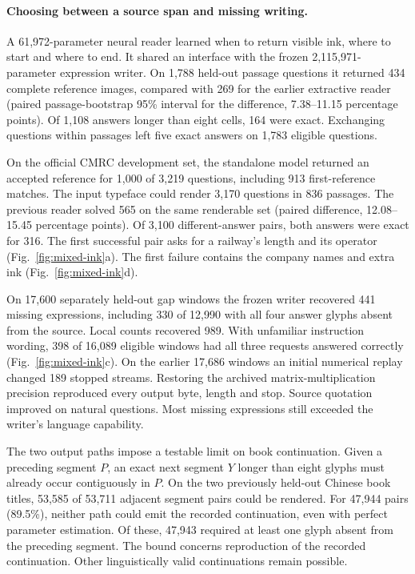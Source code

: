 \paragraph{Choosing between a source span and missing writing.}
A 61,972-parameter neural reader learned when to return visible ink, where to start and where to end. It shared an interface with the frozen 2,115,971-parameter expression writer. On 1,788 held-out passage questions it returned 434 complete reference images, compared with 269 for the earlier extractive reader (paired passage-bootstrap 95\% interval for the difference, 7.38--11.15 percentage points). Of 1,108 answers longer than eight cells, 164 were exact. Exchanging questions within passages left five exact answers on 1,783 eligible questions.

On the official CMRC development set, the standalone model returned an accepted reference for 1,000 of 3,219 questions, including 913 first-reference matches. The input typeface could render 3,170 questions in 836 passages. The previous reader solved 565 on the same renderable set (paired difference, 12.08--15.45 percentage points). Of 3,100 different-answer pairs, both answers were exact for 316. The first successful pair asks for a railway's length and its operator (Fig.~\ref{fig:mixed-ink}a). The first failure contains the company names and extra ink (Fig.~\ref{fig:mixed-ink}d).

On 17,600 separately held-out gap windows the frozen writer recovered 441 missing expressions, including 330 of 12,990 with all four answer glyphs absent from the source. Local counts recovered 989. With unfamiliar instruction wording, 398 of 16,089 eligible windows had all three requests answered correctly (Fig.~\ref{fig:mixed-ink}c). On the earlier 17,686 windows an initial numerical replay changed 189 stopped streams. Restoring the archived matrix-multiplication precision reproduced every output byte, length and stop. Source quotation improved on natural questions. Most missing expressions still exceeded the writer's language capability.

The two output paths impose a testable limit on book continuation. Given a preceding segment $P$, an exact next segment $Y$ longer than eight glyphs must already occur contiguously in $P$. On the two previously held-out Chinese book titles, 53,585 of 53,711 adjacent segment pairs could be rendered. For 47,944 pairs (89.5\%), neither path could emit the recorded continuation, even with perfect parameter estimation. Of these, 47,943 required at least one glyph absent from the preceding segment. The bound concerns reproduction of the recorded continuation. Other linguistically valid continuations remain possible.
